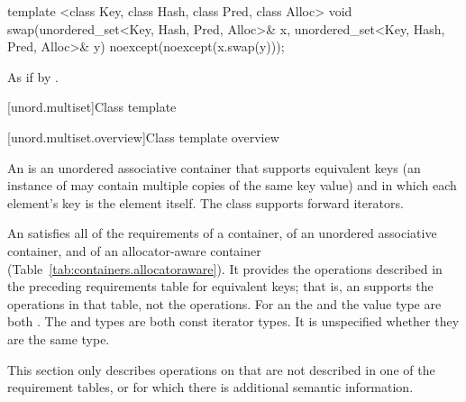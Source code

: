 %
%
\begin{itemdecl}
template <class Key, class Hash, class Pred, class Alloc>
  void swap(unordered_set<Key, Hash, Pred, Alloc>& x,
            unordered_set<Key, Hash, Pred, Alloc>& y)
    noexcept(noexcept(x.swap(y)));
\end{itemdecl}

\begin{itemdescr}
\pnum\effects As if by .
\end{itemdescr}

[unord.multiset]{Class template }%

[unord.multiset.overview]{Class template  overview}

\pnum
{}%
%
An  is an unordered associative container
that supports equivalent keys (an instance of  may contain
multiple copies of the same key value) and in which each element's key
is the element itself.
The  class
supports forward iterators.

\pnum
An  satisfies all of the requirements of a container, of an
unordered associative container, and of an allocator-aware container
(Table~\ref{tab:containers.allocatoraware}). It provides the operations described in the
preceding requirements table for equivalent keys; that is, an 
supports the  operations in that table, not the  operations.
For an  the  and the value type are
both . The  and  types are both const
iterator types. It is unspecified whether they are the same type.

\pnum
This section only describes operations on  that
are not described in one of the requirement tables, or for which there
is additional semantic information.

